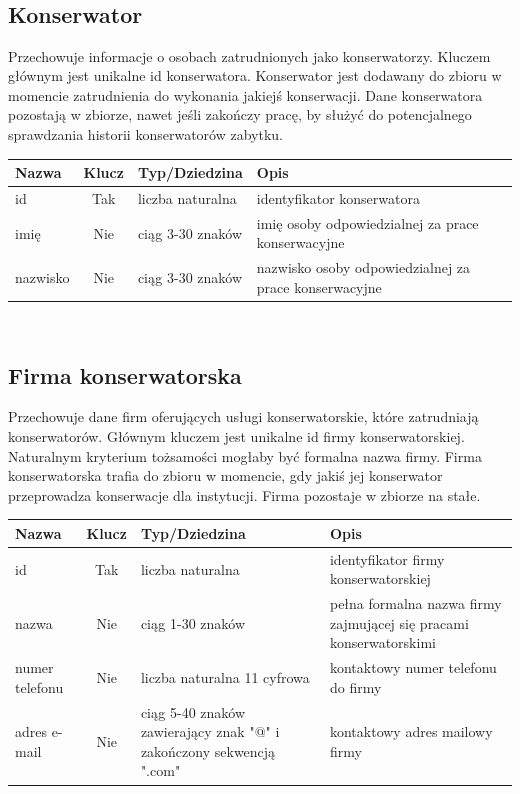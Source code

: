 \documentclass{article}
\begin{document}
\subsection*{\\Konserwator}
Przechowuje informacje o osobach zatrudnionych jako konserwatorzy. Kluczem głównym jest unikalne id konserwatora. Konserwator jest dodawany do zbioru w momencie zatrudnienia do wykonania jakiejś konserwacji. Dane konserwatora pozostają w zbiorze, nawet jeśli zakończy pracę, by służyć do potencjalnego sprawdzania historii konserwatorów zabytku.
\begin{longtable}{|C{3cm}|c|C{4.5cm}|C{5cm}|}
\hline
\textbf{Nazwa} & \textbf{Klucz} & \textbf{Typ/Dziedzina} & \textbf{Opis} \\ \hline
id & Tak & liczba naturalna & identyfikator konserwatora \\ \hline 
imię & Nie & ciąg 3-30 znaków & imię osoby odpowiedzialnej za prace konserwacyjne \\ \hline
nazwisko & Nie & ciąg 3-30 znaków & nazwisko osoby odpowiedzialnej za prace konserwacyjne \\ \hline
\end{longtable}

\subsection*{\\Firma konserwatorska}
Przechowuje dane firm oferujących usługi konserwatorskie, które zatrudniają konserwatorów. Głównym kluczem jest unikalne id firmy konserwatorskiej. Naturalnym kryterium tożsamości mogłaby być formalna nazwa firmy. Firma konserwatorska trafia do zbioru w momencie, gdy jakiś jej konserwator przeprowadza konserwacje dla instytucji. Firma pozostaje w zbiorze na stałe.  
\begin{longtable}{|C{3cm}|c|C{4.5cm}|C{5cm}|}
\hline
\textbf{Nazwa} & \textbf{Klucz} & \textbf{Typ/Dziedzina} & \textbf{Opis} \\ \hline
id & Tak & liczba naturalna & identyfikator firmy konserwatorskiej \\ \hline 
nazwa & Nie & ciąg 1-30 znaków & pełna formalna nazwa firmy zajmującej się pracami konserwatorskimi \\ \hline 
numer telefonu & Nie & liczba naturalna 11 cyfrowa & kontaktowy numer telefonu do firmy \\ \hline
adres e-mail & Nie & ciąg 5-40 znaków zawierający znak "@" i zakończony sekwencją ".com" & kontaktowy adres mailowy firmy \\ \hline
\end{longtable}
\end{document}
